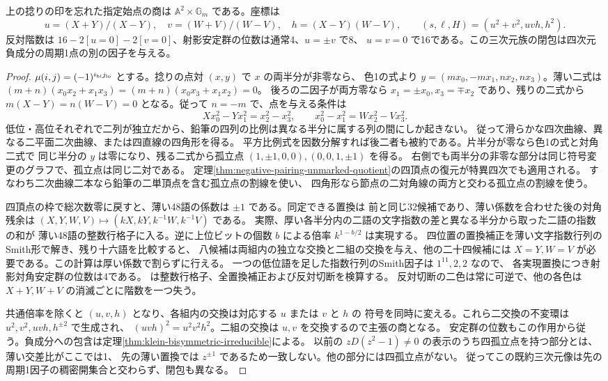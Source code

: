 \begin{theorem}\label{thm:singular-exchange-negative-quotient}
上の捻りの印を忘れた指定始点の商は $\mathbb A^2\times\mathbb G_m$ である。座標は
\[
 u=(X+Y)/(X-Y),\quad v=(W+V)/(W-V),\quad h=(X-Y)(W-V),
 \qquad (s,\ell,H)=(u^2+v^2,uvh,h^2).
\]
反対階数は $16-2[u=0]-2[v=0]$、射影安定群の位数は通常4、$u=\pm v$ で8、
$u=v=0$ で16である。この三次元族の閉包は四次元負成分の周期1点の別の因子を与える。
\end{theorem}
\begin{proof}
$\mu(i,j)=(-1)^{i_{\rm hi}j_{\rm lo}}$ とする。捻りの点対 $(x,y)$ で $x$ の両半分が非零なら、
色1の式より $y=(m x_0,-m x_1,n x_2,n x_3)$。薄い二式は
$(m+n)(x_0x_2+x_1x_3)=(m+n)(x_0x_3+x_1x_2)=0$。
後ろの二因子が両方零なら $x_1=\pm x_0,x_3=\mp x_2$ であり、残りの二式から
$m(X-Y)=n(W-V)=0$ となる。従って $n=-m$ で、点を与える条件は
\[
 Xx_0^2-Yx_1^2=x_2^2-x_3^2,\qquad x_0^2-x_1^2=Wx_2^2-Vx_3^2 .
\]
低位・高位それぞれで二列が独立だから、鉛筆の四列の比例は異なる半分に属する列の間にしか起きない。
従って滑らかな四次曲線、異なる二平面二次曲線、または四直線の四角形を得る。
平方比例式を因数分解すれば後二者も被約である。片半分が零なら色1の式と対角二式で
同じ半分の $y$ は零になり、残る二式から孤立点 $(1,\pm1,0,0),(0,0,1,\pm1)$ を得る。
右側でも両半分の非零な部分は同じ符号変更のグラフで、孤立点は同じ二対である。
定理\ref{thm:negative-pairing-unmarked-quotient}の四頂点の復元が特異四次でも適用される。
すなわち二次曲線二本なら鉛筆の二単頂点を含む孤立点の割線を使い、
四角形なら節点の二対角線の両方と交わる孤立点の割線を使う。

四頂点の枠で総次数零に戻すと、薄い48語の係数は $\pm1$ である。同定できる置換は
前と同じ32候補であり、薄い係数を合わせた後の対角残余は
$(X,Y,W,V)\mapsto(kX,kY,k^{-1}W,k^{-1}V)$ である。
実際、厚い各半分内の二語の文字指数の差と異なる半分から取った二語の指数の和が
薄い48語の整数行格子に入る。逆に上位ビットの個数 $b$ による倍率 $k^{1-b/2}$ は実現する。
四位置の置換補正を薄い文字指数行列のSmith形で解き、残り十六語を比較すると、
八候補は両組内の独立な交換と二組の交換を与え、他の二十四候補には
$X=Y,W=V$ が必要である。この計算は厚い係数で割らずに行える。
一つの低位語を足した指数行列のSmith因子は $1^{11},2,2$ なので、
各実現置換につき射影対角安定群の位数は4である。
 は整数行格子、全置換補正および反対切断を検算する。
反対切断の二色は常に可逆で、他の各色は $X+Y,W+V$ の消滅ごとに階数を一つ失う。

共通倍率を除くと $(u,v,h)$ となり、各組内の交換は対応する $u$ または $v$ と $h$ の
符号を同時に変える。これら二交換の不変環は $u^2,v^2,uvh,h^{\pm2}$ で生成され、
$(uvh)^2=u^2v^2h^2$。二組の交換は $u,v$ を交換するので主張の商となる。
安定群の位数もこの作用から従う。負成分への包含は定理\ref{thm:klein-bisymmetric-irreducible}による。
以前の $zD(z^2-1)\ne0$ の表示のうち四孤立点を持つ部分とは、薄い交差比がここでは1、
先の薄い置換では $z^{\pm1}$ であるため一致しない。他の部分には四孤立点がない。
従ってこの既約三次元像は先の周期1因子の稠密開集合と交わらず、閉包も異なる。
\end{proof}

